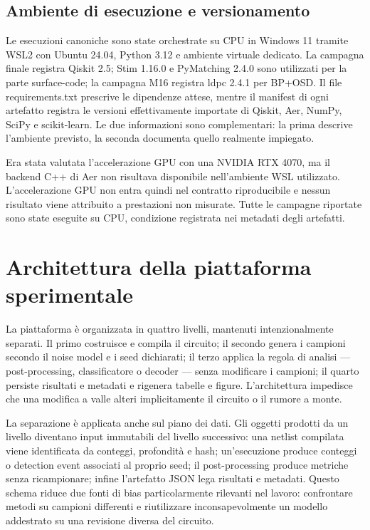 \subsection{Ambiente di esecuzione e versionamento}\label{sec:finale_4_1_2}\label{sec:gpu_limit}

Le esecuzioni canoniche sono state orchestrate su CPU in Windows 11 tramite WSL2 con Ubuntu 24.04, Python 3.12 e ambiente virtuale dedicato. La campagna finale registra Qiskit 2.5; Stim 1.16.0 e PyMatching 2.4.0 sono utilizzati per la parte surface-code; la campagna M16 registra ldpc 2.4.1 per BP+OSD. Il file requirements.txt prescrive le dipendenze attese, mentre il manifest di ogni artefatto registra le versioni effettivamente importate di Qiskit, Aer, NumPy, SciPy e scikit-learn. Le due informazioni sono complementari: la prima descrive l'ambiente previsto, la seconda documenta quello realmente impiegato.

Era stata valutata l'accelerazione GPU con una NVIDIA RTX 4070, ma il backend C++ di Aer non risultava disponibile nell'ambiente WSL utilizzato. L'accelerazione GPU non entra quindi nel contratto riproducibile e nessun risultato viene attribuito a prestazioni non misurate. Tutte le campagne riportate sono state eseguite su CPU, condizione registrata nei metadati degli artefatti.

\section{Architettura della piattaforma sperimentale}\label{sec:finale_4_2}

La piattaforma è organizzata in quattro livelli, mantenuti intenzionalmente separati. Il primo costruisce e compila il circuito; il secondo genera i campioni secondo il noise model e i seed dichiarati; il terzo applica la regola di analisi --- post-processing, classificatore o decoder --- senza modificare i campioni; il quarto persiste risultati e metadati e rigenera tabelle e figure. L'architettura impedisce che una modifica a valle alteri implicitamente il circuito o il rumore a monte.

La separazione è applicata anche sul piano dei dati. Gli oggetti prodotti da un livello diventano input immutabili del livello successivo: una netlist compilata viene identificata da conteggi, profondità e hash; un'esecuzione produce conteggi o detection event associati al proprio seed; il post-processing produce metriche senza ricampionare; infine l'artefatto JSON lega risultati e metadati. Questo schema riduce due fonti di bias particolarmente rilevanti nel lavoro: confrontare metodi su campioni differenti e riutilizzare inconsapevolmente un modello addestrato su una revisione diversa del circuito.

